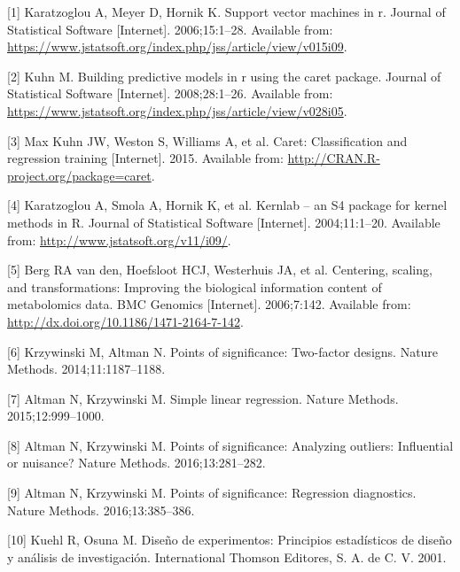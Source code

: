 \documentclass[12pt,spanish,a4paper]{article}
\numberwithin{equation}{section}
\begin{document}
\hypertarget{refs}{}
\leavevmode\hypertarget{ref-JSSv015i09}{}%
{[}1{]} Karatzoglou A, Meyer D, Hornik K. Support vector machines in r.
Journal of Statistical Software {[}Internet{]}. 2006;15:1--28. Available
from:
\url{https://www.jstatsoft.org/index.php/jss/article/view/v015i09}.

\leavevmode\hypertarget{ref-JSSv028i05}{}%
{[}2{]} Kuhn M. Building predictive models in r using the caret package.
Journal of Statistical Software {[}Internet{]}. 2008;28:1--26. Available
from:
\url{https://www.jstatsoft.org/index.php/jss/article/view/v028i05}.

\leavevmode\hypertarget{ref-caret2015}{}%
{[}3{]} Max Kuhn JW, Weston S, Williams A, et al. Caret: Classification
and regression training {[}Internet{]}. 2015. Available from:
\url{http://CRAN.R-project.org/package=caret}.

\leavevmode\hypertarget{ref-kernlab2004}{}%
{[}4{]} Karatzoglou A, Smola A, Hornik K, et al. Kernlab -- an S4
package for kernel methods in R. Journal of Statistical Software
{[}Internet{]}. 2004;11:1--20. Available from:
\url{http://www.jstatsoft.org/v11/i09/}.

\leavevmode\hypertarget{ref-vandenBerg2006}{}%
{[}5{]} Berg RA van den, Hoefsloot HCJ, Westerhuis JA, et al. Centering,
scaling, and transformations: Improving the biological information
content of metabolomics data. BMC Genomics {[}Internet{]}. 2006;7:142.
Available from: \url{http://dx.doi.org/10.1186/1471-2164-7-142}.

\leavevmode\hypertarget{ref-krzywinskipostd2014}{}%
{[}6{]} Krzywinski M, Altman N. Points of significance: Two-factor
designs. Nature Methods. 2014;11:1187--1188.

\leavevmode\hypertarget{ref-altmanslr2015}{}%
{[}7{]} Altman N, Krzywinski M. Simple linear regression. Nature
Methods. 2015;12:999--1000.

\leavevmode\hypertarget{ref-altman2016a}{}%
{[}8{]} Altman N, Krzywinski M. Points of significance: Analyzing
outliers: Influential or nuisance? Nature Methods. 2016;13:281--282.

\leavevmode\hypertarget{ref-altman2016b}{}%
{[}9{]} Altman N, Krzywinski M. Points of significance: Regression
diagnostics. Nature Methods. 2016;13:385--386.

\leavevmode\hypertarget{ref-kuehl2001}{}%
{[}10{]} Kuehl R, Osuna M. Diseño de experimentos: Principios
estadísticos de diseño y análisis de investigación. International
Thomson Editores, S. A. de C. V. 2001.
\end{document}
